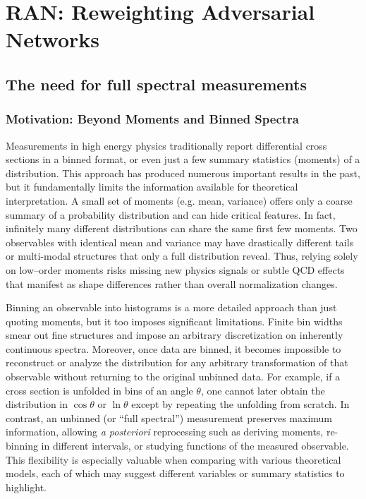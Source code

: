 \chapter{RAN: Reweighting Adversarial Networks}
\label{chap:ran}
\section{The need for full spectral measurements}
    \label{sec:need-for-density-unfolding}
    \subsection{Motivation: Beyond Moments and Binned Spectra}
    Measurements in high energy physics traditionally report differential cross sections in a binned format, or even just a few summary statistics (moments) of a distribution. 
    This approach has produced numerous important results in the past, but it fundamentally limits the information available for theoretical interpretation.
    A small set of moments (e.g. mean, variance) offers only a coarse summary of a probability distribution and can hide critical features.
    In fact, infinitely many different distributions can share the same first few moments.
    Two observables with identical mean and variance may have drastically different tails or multi-modal structures that only a full distribution reveal.
    Thus, relying solely on low--order moments risks missing new physics signals or subtle QCD effects that manifest as shape differences rather than overall normalization changes.

    Binning an observable into histograms is a more detailed approach than just quoting moments, but it too imposes significant limitations.
    Finite bin widths smear out fine structures and impose an arbitrary discretization on inherently continuous spectra.
    Moreover, once data are binned, it becomes impossible to reconstruct or analyze the distribution for any arbitrary transformation of that observable without returning to the original unbinned data.
    For example, if a cross section is unfolded in bins of an angle $\theta$, one cannot later obtain the distribution in $\cos\theta$ or $\ln\theta$ except by repeating the unfolding from scratch.
    In contrast, an unbinned (or “full spectral”) measurement preserves maximum information, allowing \textit{a posteriori} reprocessing such as deriving moments, re-binning in different intervals, or studying functions of the measured observable.
    This flexibility is especially valuable when comparing with various theoretical models, each of which may suggest different variables or summary statistics to highlight.

